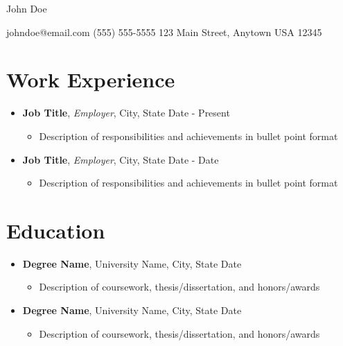 \documentclass[11pt,a4paper]{article}
\begin{document}

    \begin{center}
        \Huge John Doe
    \end{center}

    \begin{center}
        \faEnvelope \hspace{0.2cm} johndoe@email.com \hspace{0.5cm}
        \faPhone \hspace{0.2cm} (555) 555-5555 \hspace{0.5cm}
        \faMapMarker \hspace{0.2cm} 123 Main Street, Anytown USA 12345
    \end{center}

    \section*{Work Experience}

    \begin{itemize}
        \item \textbf{Job Title}, \textit{Employer}, City, State \hfill Date - Present
        \begin{itemize}
            \item Description of responsibilities and achievements in bullet point format
        \end{itemize}

        \item \textbf{Job Title}, \textit{Employer}, City, State \hfill Date - Date
        \begin{itemize}
            \item Description of responsibilities and achievements in bullet point format
        \end{itemize}
    \end{itemize}

    \section*{Education}

    \begin{itemize}
        \item \textbf{Degree Name}, University Name, City, State \hfill Date
        \begin{itemize}
            \item Description of coursework, thesis/dissertation, and honors/awards
        \end{itemize}

        \item \textbf{Degree Name}, University Name, City, State \hfill Date
        \begin{itemize}
            \item Description of coursework, thesis/dissertation, and honors/awards
        \end{itemize}
    \end{itemize}
\end{document}
